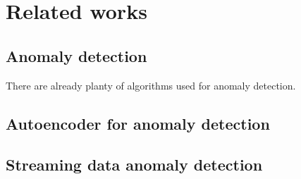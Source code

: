 \chapter{Related works}
\label{chap:related works}


\section{Anomaly detection}
\label{sec:anomaly detection}

There are already planty of algorithms used for anomaly detection. 


\section{Autoencoder for anomaly detection}
\label{sec:autoencoder for anomaly detection}




\section{Streaming data anomaly detection}
\label{sec:streaming data anomaly detection}







